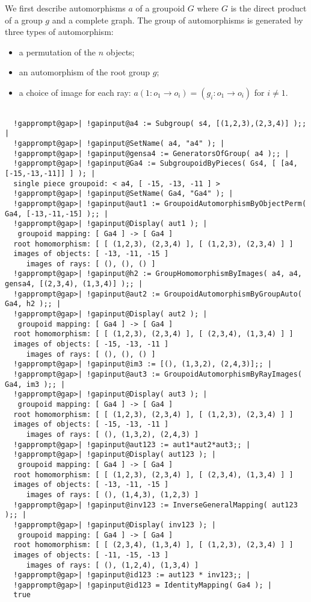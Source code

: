 \documentclass[a4paper,11pt]{report}
\begin{document}
{{{ We first describe automorphisms $a$ of a groupoid $G$ where $G$ is the direct product of a group $g$ and a complete graph. The group of automorphisms is generated by three types
of automorphism: 
\begin{itemize}
\item  a permutation of the $n$ objects; 
\item  an automorphism of the root group $g$; 
\item  a choice of image for each ray: $a(1 : o_1 \to o_i) = (g_i : o_1 \to o_i)$ for $i \ne 1$. 
\end{itemize}
 

 
\begin{Verbatim}[commandchars=!@|,fontsize=\small,frame=single,label=Example]
  
  !gapprompt@gap>| !gapinput@a4 := Subgroup( s4, [(1,2,3),(2,3,4)] );; |
  !gapprompt@gap>| !gapinput@SetName( a4, "a4" ); |
  !gapprompt@gap>| !gapinput@gensa4 := GeneratorsOfGroup( a4 );; |
  !gapprompt@gap>| !gapinput@Ga4 := SubgroupoidByPieces( Gs4, [ [a4, [-15,-13,-11]] ] ); |
  single piece groupoid: < a4, [ -15, -13, -11 ] >
  !gapprompt@gap>| !gapinput@SetName( Ga4, "Ga4" ); |
  !gapprompt@gap>| !gapinput@aut1 := GroupoidAutomorphismByObjectPerm( Ga4, [-13,-11,-15] );; |
  !gapprompt@gap>| !gapinput@Display( aut1 ); |
   groupoid mapping: [ Ga4 ] -> [ Ga4 ]
  root homomorphism: [ [ (1,2,3), (2,3,4) ], [ (1,2,3), (2,3,4) ] ]
  images of objects: [ -13, -11, -15 ]
     images of rays: [ (), (), () ]
  !gapprompt@gap>| !gapinput@h2 := GroupHomomorphismByImages( a4, a4, gensa4, [(2,3,4), (1,3,4)] );; |
  !gapprompt@gap>| !gapinput@aut2 := GroupoidAutomorphismByGroupAuto( Ga4, h2 );; |
  !gapprompt@gap>| !gapinput@Display( aut2 ); |
   groupoid mapping: [ Ga4 ] -> [ Ga4 ]
  root homomorphism: [ [ (1,2,3), (2,3,4) ], [ (2,3,4), (1,3,4) ] ]
  images of objects: [ -15, -13, -11 ]
     images of rays: [ (), (), () ]
  !gapprompt@gap>| !gapinput@im3 := [(), (1,3,2), (2,4,3)];; |
  !gapprompt@gap>| !gapinput@aut3 := GroupoidAutomorphismByRayImages( Ga4, im3 );; |
  !gapprompt@gap>| !gapinput@Display( aut3 ); |
   groupoid mapping: [ Ga4 ] -> [ Ga4 ]
  root homomorphism: [ [ (1,2,3), (2,3,4) ], [ (1,2,3), (2,3,4) ] ]
  images of objects: [ -15, -13, -11 ]
     images of rays: [ (), (1,3,2), (2,4,3) ]
  !gapprompt@gap>| !gapinput@aut123 := aut1*aut2*aut3;; |
  !gapprompt@gap>| !gapinput@Display( aut123 ); |
   groupoid mapping: [ Ga4 ] -> [ Ga4 ]
  root homomorphism: [ [ (1,2,3), (2,3,4) ], [ (2,3,4), (1,3,4) ] ]
  images of objects: [ -13, -11, -15 ]
     images of rays: [ (), (1,4,3), (1,2,3) ]
  !gapprompt@gap>| !gapinput@inv123 := InverseGeneralMapping( aut123 );; |
  !gapprompt@gap>| !gapinput@Display( inv123 ); |
   groupoid mapping: [ Ga4 ] -> [ Ga4 ]
  root homomorphism: [ [ (2,3,4), (1,3,4) ], [ (1,2,3), (2,3,4) ] ]
  images of objects: [ -11, -15, -13 ]
     images of rays: [ (), (1,2,4), (1,3,4) ]
  !gapprompt@gap>| !gapinput@id123 := aut123 * inv123;; |
  !gapprompt@gap>| !gapinput@id123 = IdentityMapping( Ga4 ); |
  true
  

\end{Verbatim}}}}
\end{document}
